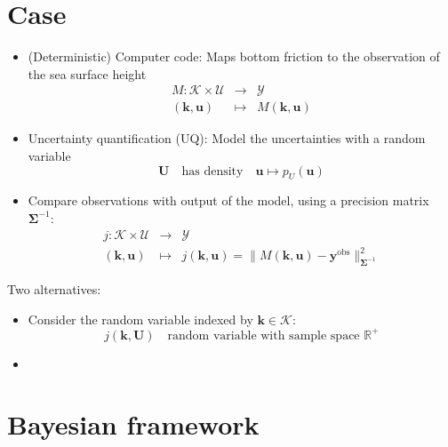 \documentclass[a0,portrait, 30pt]{a0poster}
\newcommand{\yobs}{\bm{y}^{\mathrm{obs}}}
\begin{document}
\begin{minipage}{0.48\linewidth}

\section*{Case}
\begin{itemize}
  \item (Deterministic) Computer code: Maps bottom friction to the observation of the sea surface height
\begin{equation*}
  \begin{array}{rcl}
    M: \mathcal{K} \times \mathcal{U} & \longrightarrow & \mathcal{Y} \\
    (\bm{k},\bm{u}) & \longmapsto & M(\bm{k},\bm{u})
    \end{array} 
  \end{equation*}
\item Uncertainty quantification (UQ): Model the uncertainties with a random variable
  \begin{equation*}
    \bm{U} \quad \text{has density} \quad \bm{u} \mapsto p_U(\bm{u})
  \end{equation*}
\item Compare observations with output of the model, using a precision matrix $\bm{\Sigma}^{-1}$:
  \begin{equation*}
   \begin{array}{rcl}
    j: \mathcal{K} \times \mathcal{U} & \longrightarrow & \mathcal{Y} \\
    (\bm{k},\bm{u}) & \longmapsto & j(\bm{k},\bm{u}) = \|M(\bm{k},\bm{u}) - \yobs \|^2_{\bm{\Sigma}^{-1}}
    \end{array} 
  \end{equation*}
\end{itemize}

  Two alternatives:
  \begin{itemize}
  \item  Consider the random variable indexed by $\bm{k} \in \mathcal{K}$:
    \begin{equation*}
      j(\bm{k},\bm{U}) \quad \text{random variable with sample space } \mathbb{R}^+ 
    \end{equation*}
    \item 
    \end{itemize}

    \section*{Bayesian framework}
\end{minipage}
\end{document}
